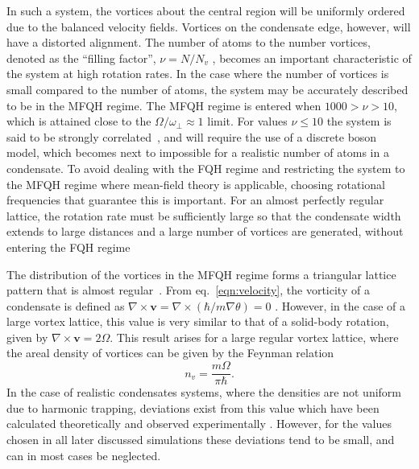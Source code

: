 In such a system, the vortices about the central region will be uniformly ordered due to the balanced velocity fields. Vortices on the condensate edge, however, will have a distorted alignment. The number of atoms to the number vortices, denoted as the ``filling factor'', $\nu=N/N_v$ \cite{BK:Ueda_2010,Vtx:Ho_prl_2001}, becomes an important characteristic of the system at high rotation rates. In the case where the number of vortices is small compared to the number of atoms, the system may be accurately described to be in the MFQH regime. The MFQH regime is entered when $1000 > \nu > 10$, which is attained close to the $\Omega / \omega_{\perp}\approx 1$ limit. For values $\nu \leq 10$ the system is said to be strongly correlated~\cite{BEC:Fetter_revmodphys_2009}, and will require the use of a discrete boson model, which becomes next to impossible for a realistic number of atoms in a condensate. To avoid dealing with the FQH regime and restricting the system to the MFQH regime where mean-field theory is applicable, choosing rotational frequencies that guarantee this is important. For an almost perfectly regular lattice, the rotation rate must be sufficiently large so that the condensate width extends to large distances and a large number of vortices are generated, without entering the FQH regime \cite{Vtx:Aftalion_pra_2005}

The distribution of the vortices in the MFQH regime forms a triangular lattice pattern that is almost regular~\cite{Vtx:Schweikhard_prl_2004}. From eq.~\eqref{eqn:velocity}, the vorticity of a condensate is defined as $\nabla \times \mathbf{v} = \nabla \times (\hbar/m \nabla \theta) = 0$ . However, in the case of a large vortex lattice, this value is very similar to that of a solid-body rotation, given by $\nabla \times \mathbf{v}=2\Omega$. This result arises for a large regular vortex lattice, where the areal density of vortices can be given by the Feynman relation~\cite{BK:Pitaevskii_Stringari_2003}
\begin{equation}\label{eqn:feynman}
n_{v} = \frac{m\Omega}{\pi\hbar}.
\end{equation}
In the case of realistic condensates systems, where the densities are not uniform due to harmonic trapping, deviations exist from this value which have been calculated theoretically \cite{Vtx:Sheey_pra_2004_2,Vtx:Sheey_pra_2004} and observed experimentally \cite{VTX:Coddington_pra_2004}. However, for the values chosen in all later discussed simulations these deviations tend to be small, and can in most cases be neglected.

